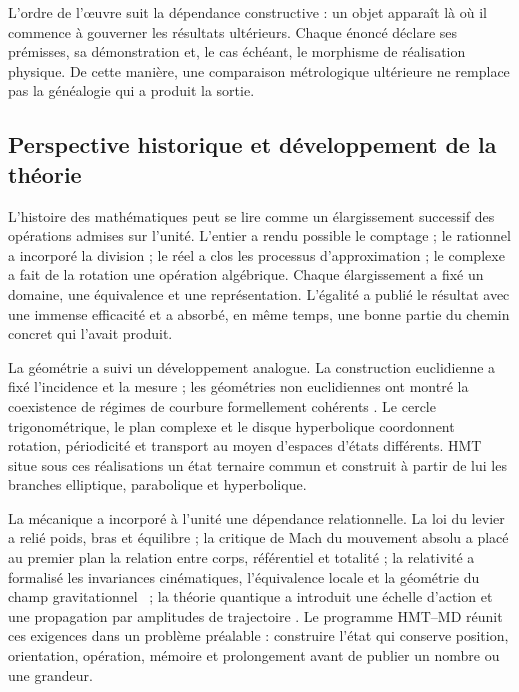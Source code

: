 L'ordre de l'œuvre suit la dépendance constructive : un objet apparaît là
où il commence à gouverner les résultats ultérieurs. Chaque énoncé déclare
ses prémisses, sa démonstration et, le cas échéant, le morphisme de
réalisation physique. De cette manière, une comparaison métrologique ultérieure ne
remplace pas la généalogie qui a produit la sortie.



\subsection*{Perspective historique et développement de la théorie}

L'histoire des mathématiques peut se lire comme un élargissement successif des
opérations admises sur l'unité. L'entier a rendu possible le comptage ;
le rationnel a incorporé la division ; le réel a clos les processus
d'approximation ; le complexe a fait de la rotation une opération algébrique.
Chaque élargissement a fixé un domaine, une équivalence et une représentation.
L'égalité a publié le résultat avec une immense efficacité et a absorbé, en même temps, une bonne
partie du chemin concret qui l'avait produit.

La géométrie a suivi un développement analogue. La construction euclidienne a fixé
l'incidence et la mesure ; les géométries non euclidiennes ont montré la coexistence
de régimes de courbure formellement cohérents
\cite{EuclidElements,PoincareScienceHypothesis}. Le cercle trigonométrique,
le plan complexe et le disque hyperbolique coordonnent rotation, périodicité et
transport au moyen d'espaces d'états différents. HMT situe sous ces
réalisations un état ternaire commun et construit à partir de lui les branches
elliptique, parabolique et hyperbolique.

La mécanique a incorporé à l'unité une dépendance relationnelle. La loi du
levier a relié poids, bras et équilibre ; la critique de Mach du mouvement
absolu a placé au premier plan la relation entre corps, référentiel et totalité
\cite{ArchimedesEquilibrium,MachMechanics} ; la relativité a formalisé les
invariances cinématiques, l'équivalence locale et la géométrie du champ
gravitationnel~\cite{Einstein1918Principles} ; la théorie quantique a introduit une
échelle d'action et une propagation par amplitudes de trajectoire
\cite{PlanckNobelLecture,Feynman1948}. Le programme HMT--MD réunit ces
exigences dans un problème préalable : construire l'état qui conserve position,
orientation, opération, mémoire et prolongement avant de publier un nombre ou
une grandeur.

